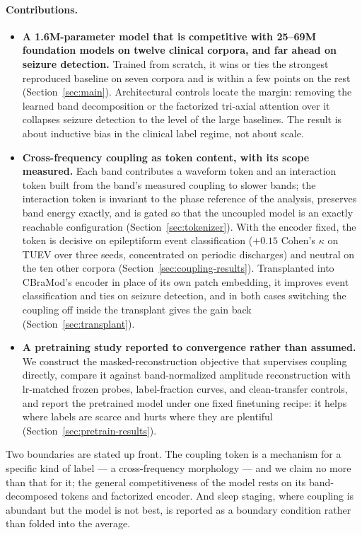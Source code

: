 \paragraph{Contributions.}
\begin{itemize}[leftmargin=*,itemsep=2pt,topsep=2pt]
\item \textbf{A 1.6M-parameter model that is competitive with 25--69M
  foundation models on twelve clinical corpora, and far ahead on seizure
  detection.} Trained from scratch, it wins or ties the strongest
  reproduced baseline on seven corpora and is within a few points on the
  rest (Section~\ref{sec:main}). Architectural controls locate the margin:
  removing the learned band decomposition or the factorized tri-axial
  attention over it collapses seizure detection to the level of the large
  baselines. The result is about inductive bias in the clinical label
  regime, not about scale.
\item \textbf{Cross-frequency coupling as token content, with its scope
  measured.} Each band contributes a waveform token and an interaction
  token built from the band's measured coupling to slower bands; the
  interaction token is invariant to the phase reference of the analysis,
  preserves band energy exactly, and is gated so that the uncoupled model
  is an exactly reachable configuration (Section~\ref{sec:tokenizer}). With
  the encoder fixed, the token is decisive on epileptiform event
  classification ($+0.15$ Cohen's $\kappa$ on TUEV over three seeds,
  concentrated on periodic discharges) and neutral on the ten other corpora
  (Section~\ref{sec:coupling-results}). Transplanted into CBraMod's encoder
  in place of its own patch embedding, it improves event classification and
  ties on seizure detection, and in both cases switching the coupling off
  inside the transplant gives the gain back (Section~\ref{sec:transplant}).
\item \textbf{A pretraining study reported to convergence rather than
  assumed.} We construct the masked-reconstruction objective that
  supervises coupling directly, compare it against band-normalized
  amplitude reconstruction \citep{yu2026understanding} with lr-matched
  frozen probes, label-fraction curves, and clean-transfer controls, and
  report the pretrained model under one fixed finetuning recipe: it helps
  where labels are scarce and hurts where they are plentiful
  (Section~\ref{sec:pretrain-results}).
\end{itemize}

Two boundaries are stated up front. The coupling token is a mechanism for
a specific kind of label --- a cross-frequency morphology --- and we claim
no more than that for it; the general competitiveness of the model rests
on its band-decomposed tokens and factorized encoder. And sleep staging,
where coupling is abundant \citep{amiri2016phase} but the model is not
best, is reported as a boundary condition rather than folded into the
average.
